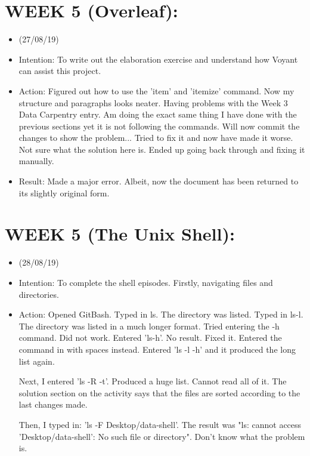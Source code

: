 \documentclass[a4paper,12pt]{article}
\begin{document}
\section{WEEK 5 (Overleaf):}

\begin{itemize}
    \item 

(27/08/19)

\item {Intention: To write out the elaboration exercise and understand how Voyant can assist this project.}

\item {Action: Figured out how to use the 'item' and 'itemize' command. Now my structure and paragraphs looks neater. Having problems with the Week 3 Data Carpentry entry. Am doing the exact same thing I have done with the previous sections yet it is not following the commands. Will now commit the changes to show the problem... Tried to fix it and now have made it worse. Not sure what the solution here is. Ended up going back through and fixing it manually.}

\item {Result: Made a major error. Albeit, now the document has been returned to its slightly original form.}

\end{itemize}

\section{WEEK 5 (The Unix Shell):}

\begin{itemize}
    \item 

(28/08/19)

\item Intention: To complete the shell episodes. Firstly, navigating files and directories. 

\item Action: Opened GitBash. Typed in ls. The directory was listed. Typed in ls-l. The directory was listed in a much longer format. Tried entering the -h command. Did not work. Entered 'ls-h'. No result. Fixed it. Entered the command in with spaces instead. Entered 'ls -l -h' and it produced the long list again. 

Next, I entered 'ls -R -t'. Produced a huge list. Cannot read all of it. The solution section on the activity says that the files are sorted according to the last changes made. 

Then, I typed in: 'ls -F Desktop/data-shell'. The result was "ls: cannot access 'Desktop/data-shell': No such file or directory". Don't know what the problem is. 

    
    
    
    
\end{itemize}
\end{document}
